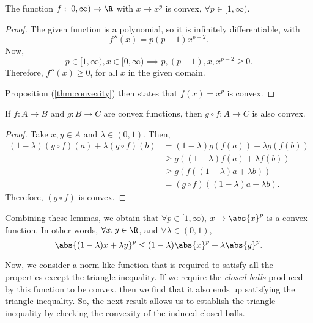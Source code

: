 \documentclass[draft]{penrose}
\begin{document}
\begin{nlemma}
  The function $f : [0,\infty) \to \R$ with $x \mapsto x^p$ is convex, $\forall p \in [1,\infty)$.
\end{nlemma}
\begin{proof}
  The given function is a polynomial, so it is infinitely differentiable, with
  \begin{equation*}
    f''(x) = p(p-1)x^{p-2}.
  \end{equation*}
  Now,
  \begin{equation*}
    p \in [1,\infty), x \in [0,\infty) \implies p, (p-1), x, x^{p-2} \geq 0.
  \end{equation*}
  Therefore, $f''(x) \geq 0$, for all $x$ in the given domain.

  Proposition (\ref{thm:convexity}) then states that $f(x) = x^p$ is convex.
\end{proof}

\begin{nlemma}
  If $f: A \to B$ and $g: B \to C$ are convex functions, then $g \circ f : A \to C$ is also convex.
\end{nlemma}
\begin{proof}
  Take $x,y \in A$ and $\lambda \in (0,1)$. Then,
  \begin{align*}
  (1-\lambda) (g \circ f)(a) + \lambda (g \circ f)(b)
  &= (1-\lambda) g(f(a)) + \lambda g(f(b))\\
  &\geq g\left((1-\lambda) f(a) + \lambda f(b)\right)\\
  &\geq g\left(f\left((1-\lambda) a + \lambda b\right)\right)\\
  &= (g \circ f)\left((1-\lambda) a + \lambda b\right).
  \end{align*}
  Therefore, $(g \circ f)$ is convex.
\end{proof}

Combining these lemmas, we obtain that $\forall p \in [1,\infty)$, $x \mapsto \abs{x}^{p}$ is a convex function. In other words, $\forall x,y \in \R$, and $\forall \lambda \in (0,1)$,
\begin{equation*}
  \abs{(1-\lambda) x + \lambda y}^{p} \leq (1-\lambda) \abs{x}^{p} + \lambda \abs{y}^{p}.
\end{equation*}

Now, we consider a norm-like function that is required to satisfy all the properties except the triangle inequality. If we require the \emph{closed balls} produced by this function to be convex, then we find that it also ends up satisfying the triangle inequality. So, the next result allows us to establish the triangle inequality by checking the convexity of the induced closed balls.
\end{document}
